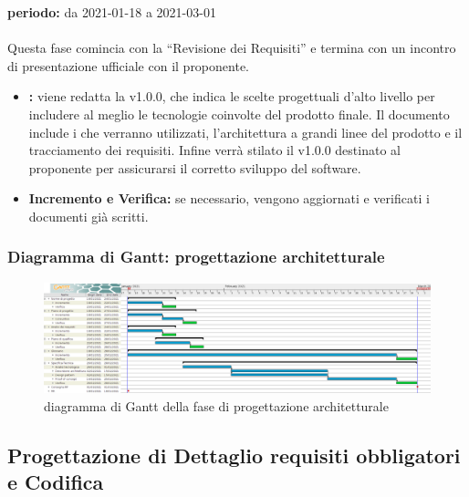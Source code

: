 	\textbf{periodo:} da 2021-01-18 a 2021-03-01 
	\\
	\\
	Questa fase comincia con la “Revisione dei Requisiti” e termina con un incontro di presentazione ufficiale con il proponente.
	\begin{itemize}
		\item \textbf{:} viene redatta la  v1.0.0, che indica le scelte progettuali d’alto livello per includere al meglio le tecnologie coinvolte del prodotto finale. Il documento include i  che verranno utilizzati, l’architettura a grandi linee del prodotto e il tracciamento dei requisiti. Infine verrà stilato il  v1.0.0 destinato al proponente per assicurarsi il corretto sviluppo del software.
		\item \textbf{Incremento e Verifica:} se necessario, vengono aggiornati e verificati i documenti già scritti.
	\end{itemize}  

	\subsubsection{Diagramma di Gantt: progettazione architetturale}

		\begin{figure}[H]
			\centering
			\includegraphics[width=1\linewidth]{./res/images/Architetturale.png}
			\caption{diagramma di Gantt della fase di progettazione architetturale}
			\label{fig:diagramma di Gantt della fase di progettazione architetturale}
		\end{figure}
	
	
\subsection{Progettazione di Dettaglio requisiti obbligatori e Codifica}


